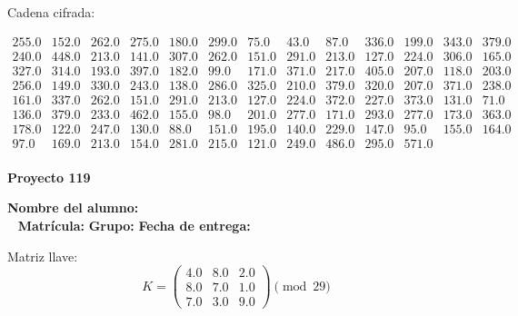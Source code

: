 \documentclass[12pt]{article}
\begin{document}
Cadena cifrada:
\begin{center}
$\begin{array}{lllllllllllll}
255.0 & 152.0 & 262.0 & 275.0 & 180.0 & 299.0 & 75.0 & 43.0 & 87.0 & 336.0 & 199.0 & 343.0 & 379.0\\
240.0 & 448.0 & 213.0 & 141.0 & 307.0 & 262.0 & 151.0 & 291.0 & 213.0 & 127.0 & 224.0 & 306.0 & 165.0\\
327.0 & 314.0 & 193.0 & 397.0 & 182.0 & 99.0 & 171.0 & 371.0 & 217.0 & 405.0 & 207.0 & 118.0 & 203.0\\
256.0 & 149.0 & 330.0 & 243.0 & 138.0 & 286.0 & 325.0 & 210.0 & 379.0 & 320.0 & 207.0 & 371.0 & 238.0\\
161.0 & 337.0 & 262.0 & 151.0 & 291.0 & 213.0 & 127.0 & 224.0 & 372.0 & 227.0 & 373.0 & 131.0 & 71.0\\
136.0 & 379.0 & 233.0 & 462.0 & 155.0 & 98.0 & 201.0 & 277.0 & 171.0 & 293.0 & 277.0 & 173.0 & 363.0\\
178.0 & 122.0 & 247.0 & 130.0 & 88.0 & 151.0 & 195.0 & 140.0 & 229.0 & 147.0 & 95.0 & 155.0 & 164.0\\
97.0 & 169.0 & 213.0 & 154.0 & 281.0 & 215.0 & 121.0 & 249.0 & 486.0 & 295.0 & 571.0\\
\end{array}$
\end{center}

\newpage


\textbf{Proyecto 119}

\textbf{Nombre del alumno:} \underline{\hspace{13cm}}\\\
\vspace{1cm}
\textbf{Matrícula:} \underline{\hspace{4cm}} \hspace{1cm}
\textbf{Grupo:} \underline{\hspace{2cm}}
\textbf{Fecha de entrega:} \underline{\hspace{2cm}}

\medskip

Matriz llave:
\[
K = \begin{pmatrix}
4.0 & 8.0 & 2.0\\
8.0 & 7.0 & 1.0\\
7.0 & 3.0 & 9.0
\end{pmatrix} \pmod{29}
\]
\end{document}
